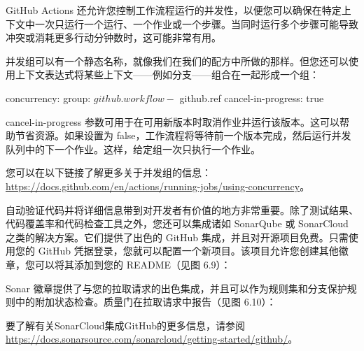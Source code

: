 GitHub Actions 还允许您控制工作流程运行的并发性，以便您可以确保在特定上下文中一次只运行一个运行、一个作业或一个步骤。当同时运行多个步骤可能导致冲突或消耗更多行动分钟数时，这可能非常有用。

并发组可以有一个静态名称，就像我们在我们的配方中所做的那样。但您还可以使用上下文表达式将某些上下文——例如分支——组合在一起形成一个组：

\begin{shell}
concurrency:
  group: ${{ github.workflow }}-${{ github.ref }}
  cancel-in-progress: true
\end{shell}

cancel-in-progress 参数可用于在可用新版本时取消作业并运行该版本。这可以帮助节省资源。如果设置为 false，工作流程将等待前一个版本完成，然后运行并发队列中的下一个作业。这样，给定组一次只执行一个作业。

您可以在以下链接了解更多关于并发组的信息：\url{https://docs.github.com/en/actions/running-jobs/using-concurrency}。


自动验证代码并将详细信息带到对开发者有价值的地方非常重要。除了测试结果、代码覆盖率和代码检查工具之外，您还可以集成诸如 SonarQube 或 SonarCloud 之类的解决方案。它们提供了出色的 GitHub 集成，并且对开源项目免费。只需使用您的 GitHub 凭据登录，您就可以配置一个新项目。该项目允许您创建其他徽章，您可以将其添加到您的 README（见图 6.9）：


Sonar 徽章提供了与您的拉取请求的出色集成，并且可以作为规则集和分支保护规则中的附加状态检查。质量门在拉取请求中报告（见图 6.10）：


要了解有关SonarCloud集成GitHub的更多信息，请参阅\url{https://docs.sonarsource.com/sonarcloud/getting-started/github/}。














